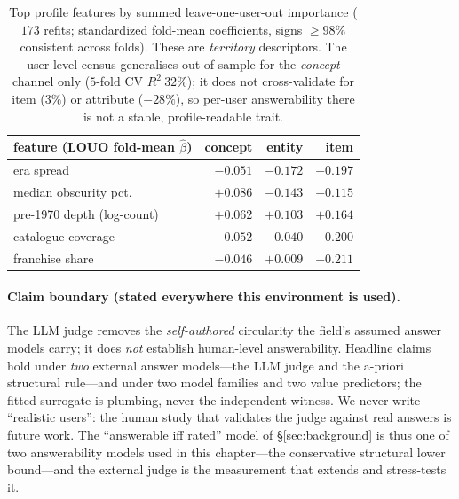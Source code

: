 \documentclass[11pt]{article}
\begin{document}
\begin{table}[h]\centering\small
\begin{tabular}{lrrr}
\toprule
feature (LOUO fold-mean $\hat\beta$) & concept & entity & item\\
\midrule
era spread              & $-0.051$ & $-0.172$ & $-0.197$\\
median obscurity pct.\  & $+0.086$ & $-0.143$ & $-0.115$\\
pre-1970 depth (log-count) & $+0.062$ & $+0.103$ & $+0.164$\\
catalogue coverage      & $-0.052$ & $-0.040$ & $-0.200$\\
franchise share         & $-0.046$ & $+0.009$ & $-0.211$\\
\bottomrule
\end{tabular}
\caption{Top profile features by summed leave-one-user-out importance ($173$ refits; standardized fold-mean
coefficients, signs $\ge98\%$ consistent across folds). These are \emph{territory} descriptors. The user-level census
generalises out-of-sample for the \emph{concept} channel only ($5$-fold CV $R^2\ 32\%$); it does not cross-validate
for item ($3\%$) or attribute ($-28\%$), so per-user answerability there is not a stable, profile-readable trait.}
\label{tab:distillfeat}
\end{table}

\paragraph{Claim boundary (stated everywhere this environment is used).} The LLM judge removes the
\emph{self-authored} circularity the field's assumed answer models carry; it does \emph{not} establish
human-level answerability. Headline claims hold under \emph{two} external answer models---the LLM judge and the
a-priori structural rule---and under two model families and two value predictors; the fitted surrogate is plumbing,
never the independent witness. We never write ``realistic users'': the human study that validates the judge against
real answers is future work. The ``answerable iff rated'' model of \S\ref{sec:background} is thus one of two
answerability models used in this chapter---the conservative structural lower bound---and the external judge is the
measurement that extends and stress-tests it.
\end{document}
